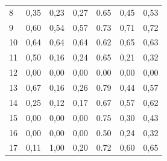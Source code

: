 \begin{table}[ht]
\begin{tabular}{l|c|c|c|c|c|c}
        8     & 0,35                                    & 0,23                                        & 0,27      &
        0.65  & 0,45                                    & 0,53                                                      \\
        9     & 0,60                                    & 0,54                                        & 0,57      &
        0.73  & 0,71                                    & 0,72                                                      \\
        10    & 0,64                                    & 0,64                                        & 0,64      &
        0.62  & 0,65                                    & 0,63                                                      \\
        11    & 0,50                                    & 0,16                                        & 0,24      &
        0.65  & 0,21                                    & 0,32                                                      \\
        12    & 0,00                                    & 0,00                                        & 0,00      &
        0.00  & 0,00                                    & 0,00                                                      \\
        13    & 0,67                                    & 0,16                                        & 0,26      &
        0.79  & 0,44                                    & 0,57                                                      \\
        14    & 0,25                                    & 0,12                                        & 0,17      &
        0.67  & 0,57                                    & 0,62                                                      \\
        15    & 0,00                                    & 0,00                                        & 0,00      &
        0.75  & 0,30                                    & 0,43                                                      \\
        16    & 0,00                                    & 0,00                                        & 0,00      &
        0.50  & 0,24                                    & 0,32                                                      \\
        17    & 0,11                                    & 1,00                                        & 0,20      &
        0.72  & 0,60                                    & 0,65                                                      \\

\end{tabular}
\end{table}
